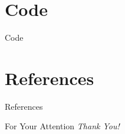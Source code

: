 \documentclass{beamer}
\begin{document}
\section{Code}

\begin{frame}[allowframebreaks]{Code}
	
\end{frame}

\section{References}
\begin{frame}[allowframebreaks]{References}
	
	\nocite{*}
    \printbibliography

\end{frame}

\begin{frame}{For Your Attention}
    \centering
    \Large
    \emph{Thank You!}
\end{frame}
\end{document}
